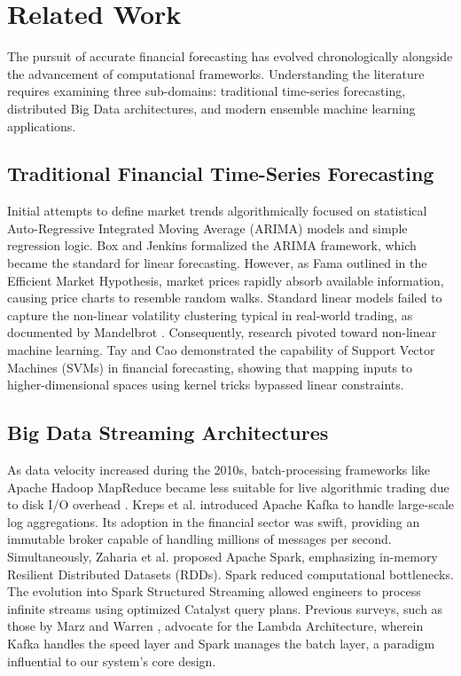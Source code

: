 \documentclass[conference]{IEEEtran}
\begin{document}
\section{Related Work}
The pursuit of accurate financial forecasting has evolved chronologically alongside the advancement of computational frameworks. Understanding the literature requires examining three sub-domains: traditional time-series forecasting, distributed Big Data architectures, and modern ensemble machine learning applications.

\subsection{Traditional Financial Time-Series Forecasting}
Initial attempts to define market trends algorithmically focused on statistical Auto-Regressive Integrated Moving Average (ARIMA) models and simple regression logic. Box and Jenkins \cite{ref1} formalized the ARIMA framework, which became the standard for linear forecasting. However, as Fama \cite{ref2} outlined in the Efficient Market Hypothesis, market prices rapidly absorb available information, causing price charts to resemble random walks. Standard linear models failed to capture the non-linear volatility clustering typical in real-world trading, as documented by Mandelbrot \cite{ref3}. Consequently, research pivoted toward non-linear machine learning. Tay and Cao \cite{ref9} demonstrated the capability of Support Vector Machines (SVMs) in financial forecasting, showing that mapping inputs to higher-dimensional spaces using kernel tricks bypassed linear constraints.

\subsection{Big Data Streaming Architectures}
As data velocity increased during the 2010s, batch-processing frameworks like Apache Hadoop MapReduce became less suitable for live algorithmic trading due to disk I/O overhead \cite{ref4}. Kreps et al. \cite{ref6} introduced Apache Kafka to handle large-scale log aggregations. Its adoption in the financial sector was swift, providing an immutable broker capable of handling millions of messages per second. 
Simultaneously, Zaharia et al. \cite{ref7} proposed Apache Spark, emphasizing in-memory Resilient Distributed Datasets (RDDs). Spark reduced computational bottlenecks. The evolution into Spark Structured Streaming \cite{ref8} allowed engineers to process infinite streams using optimized Catalyst query plans. Previous surveys, such as those by Marz and Warren \cite{ref5}, advocate for the Lambda Architecture, wherein Kafka handles the speed layer and Spark manages the batch layer, a paradigm influential to our system's core design.
\end{document}
